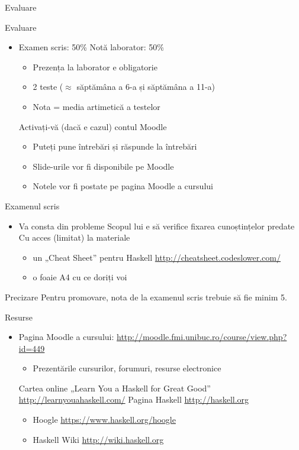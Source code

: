 \documentclass[handout,xcolor=pdftex,romanian,colorlinks]{beamer}
\begin{document}
\begin{section}{Evaluare}
\begin{frame}{Evaluare}
\begin{itemize}
\item Examen scris: 50\%  
\vitem Notă laborator: 50\%
\begin{itemize}
\item Prezența la laborator e obligatorie
\item 2 teste ($\approx$ săptămâna a 6-a și săptămâna a 11-a)
\item Nota = media artimetică a testelor
\end{itemize}
\vitem Activați-vă (dacă e cazul) contul Moodle
\begin{itemize}
\item Puteți pune întrebări și răspunde la întrebări
\item Slide-urile vor fi disponibile pe Moodle
\item Notele vor fi postate pe pagina Moodle a cursului
\end{itemize}
\end{itemize}
\end{frame}

\begin{frame}{Examenul scris}
\begin{itemize}
\item Va consta din probleme
\vitem Scopul lui e să verifice fixarea cunoștințelor predate
\vitem Cu acces (limitat) la materiale
\begin{itemize}
  \item un „Cheat Sheet” pentru Haskell \url{http://cheatsheet.codeslower.com/}
  \item o foaie A4 cu ce doriți voi
\end{itemize}
\end{itemize}

\begin{block}{Precizare}
Pentru promovare, nota de la examenul scris trebuie să fie \alert{minim 5}.
\end{block}
\end{frame}

\end{section}

\begin{frame}{Resurse}
\begin{itemize}
\item Pagina Moodle a cursului: \url{http://moodle.fmi.unibuc.ro/course/view.php?id=449}
\begin{itemize}
\item Prezentările cursurilor, forumuri, resurse electronice
\end{itemize}
\vitem Cartea online „Learn You a Haskell for Great Good” \url{http://learnyouahaskell.com/}
\vitem Pagina Haskell \url{http://haskell.org}
\begin{itemize}
\item Hoogle \url{https://www.haskell.org/hoogle}
\item Haskell Wiki \url{http://wiki.haskell.org}
\end{itemize}
\end{itemize}
\end{frame}
\end{document}
